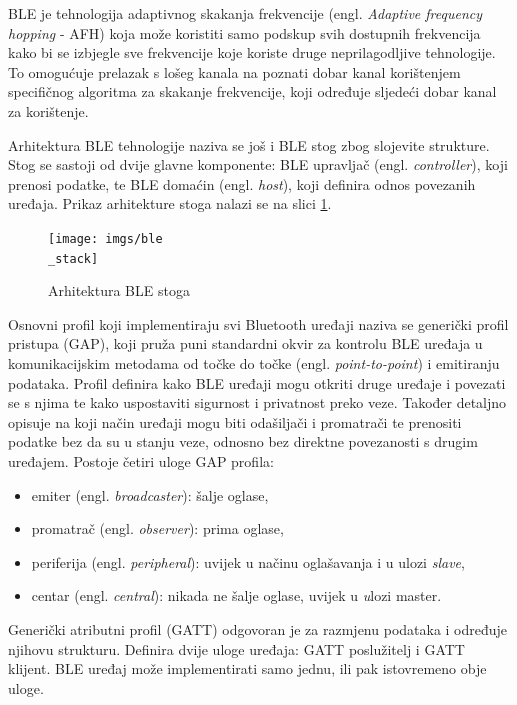 BLE je tehnologija adaptivnog skakanja frekvencije (engl. \textit{Adaptive frequency hopping} - AFH) koja može koristiti samo podskup svih dostupnih frekvencija kako bi se izbjegle sve frekvencije koje koriste druge neprilagodljive tehnologije. To omogućuje prelazak s lošeg kanala na poznati dobar kanal korištenjem specifičnog algoritma za skakanje frekvencije, koji određuje sljedeći dobar kanal za korištenje. 

Arhitektura BLE tehnologije naziva se još i BLE stog zbog slojevite strukture. Stog se sastoji od dvije glavne komponente: BLE upravljač (engl. \textit{controller}), koji prenosi podatke, te BLE domaćin (engl. \textit{host}), koji definira odnos povezanih uređaja. Prikaz arhitekture stoga nalazi se na slici \ref{fig:ble_stack}.

\begin{figure}[ht]
	\centering
	\texttt{[image: imgs/ble\\\_stack]}
	\caption{Arhitektura BLE stoga \cite{espressif}}
	\label{fig:ble_stack}
\end{figure}

Osnovni profil koji implementiraju svi Bluetooth uređaji naziva se generički profil pristupa (GAP), koji pruža puni standardni okvir za kontrolu BLE uređaja u komunikacijskim metodama od točke do točke (engl. \textit{point-to-point}) i emitiranju podataka. Profil definira kako BLE uređaji mogu otkriti druge uređaje i povezati se s njima te kako uspostaviti sigurnost i privatnost preko veze. Također detaljno opisuje na koji način uređaji mogu biti odašiljači i promatrači te prenositi podatke bez da su u stanju veze, odnosno bez direktne povezanosti s drugim uređajem. Postoje četiri uloge GAP profila:

\begin{itemize}
	\item emiter (engl. \textit{broadcaster}): šalje oglase,
	\item promatrač (engl. \textit{observer}): prima oglase,
	\item periferija (engl. \textit{peripheral}): uvijek u načinu oglašavanja i u ulozi \textit{slave}, 
	\item centar (engl. \textit{central}): nikada ne šalje oglase, uvijek u \textit ulozi {master}.
\end{itemize}

Generički atributni profil (GATT) odgovoran je za razmjenu podataka i određuje njihovu strukturu. Definira dvije uloge uređaja: GATT poslužitelj i GATT klijent. BLE uređaj može implementirati samo jednu, ili pak istovremeno obje uloge.

